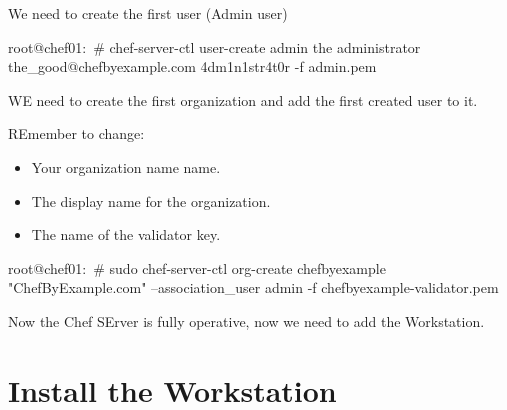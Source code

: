 We need to create the first user (Admin user)

\begin{codelisting}
\label{code:}
\codecaption{}
\begin{code}
root@chef01:~# chef-server-ctl user-create admin the administrator the_good@chefbyexample.com 4dm1n1str4t0r -f admin.pem
\end{code}
\end{codelisting}

WE need to create the first organization and add the first created user to it.

REmember to change:

\begin{itemize}
\item Your organization name name.
\item The display name for the organization.
\item The name of the validator key.
\end{itemize}

\begin{codelisting}
\label{code:}
\codecaption{}
\begin{code}
root@chef01:~# sudo chef-server-ctl org-create chefbyexample "ChefByExample.com" --association_user admin -f chefbyexample-validator.pem
\end{code}
\end{codelisting}


Now the Chef SErver is fully operative, now we need to add the Workstation.

\section{Install the Workstation}

